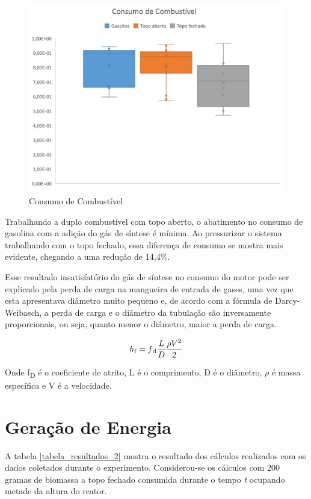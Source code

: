 \begin{figure}[!htb]
	\centering
	\includegraphics{Figuras/consumo_combustivel}
	\caption{Consumo de Combustível}
	\label{grafico_consumo}
\end{figure}

Trabalhando a duplo combustível com topo aberto, o abatimento no consumo de gasolina  com a adição do gás de síntese é mínima. Ao pressurizar o sistema trabalhando com o topo fechado, essa diferença de consumo se mostra mais evidente, chegando a uma redução de 14,4\%.

Esse resultado insatisfatório do gás de síntese no consumo do motor pode ser explicado pela perda de carga na mangueira de entrada de gases, uma vez que esta apresentava diâmetro muito pequeno e, de acordo com a fórmula de Darcy-Weibasch, a perda de carga e o diâmetro da tubulação são inversamente proporcionais, ou seja, quanto menor o diâmetro, maior a perda de carga.

\begin{equation} \label{darcy-weibasch}
 h\textsubscript{f} = f\textsubscript{d}\frac{L}{D}\frac{\rho V^2}{2}
\end{equation}

Onde f\textsubscript{D} é o coeficiente de atrito, L é o comprimento, D é o diâmetro, $\rho$ é massa específica e V é a velocidade.

\section{Geração de Energia}

A tabela \ref{tabela_resultados_2} mostra o resultado dos cálculos realizados com os dados coletados durante o experimento. Considerou-se os cálculos com 200 gramas de biomassa a topo fechado consumida durante o tempo \textit{t} ocupando metade da altura do reator.

